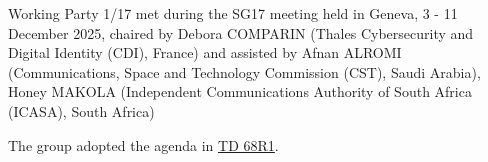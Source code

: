 Working Party 1/17 met during the SG17 meeting held in Geneva, 3 - 11 December 2025, chaired by Debora COMPARIN (Thales Cybersecurity and Digital Identity (CDI), France) and assisted by Afnan ALROMI (Communications, Space and Technology Commission (CST), Saudi Arabia), Honey MAKOLA (Independent Communications Authority of South Africa (ICASA), South Africa)

The group adopted the agenda in \href{https://www.itu.int/md/meetingdoc.asp?lang=en\&parent=T25-SG17-251203-TD-WP1-0068}{TD 68R1}.
